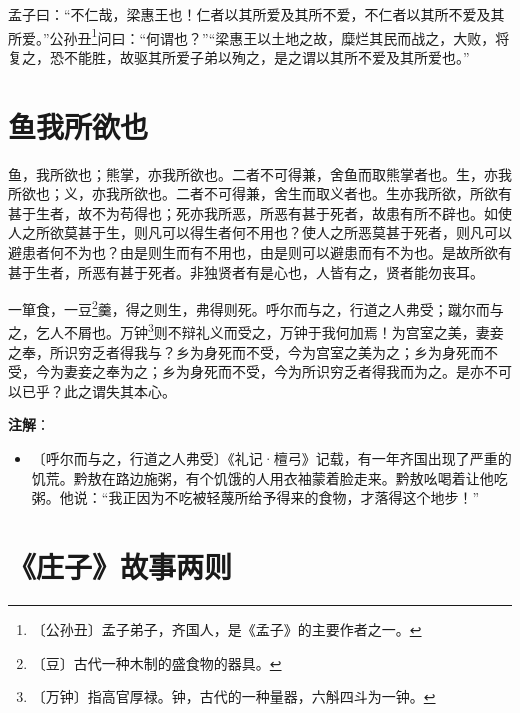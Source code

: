 \documentclass[12pt,UTF-8,openany]{ctexbook}
\begin{document}
\begin{normalsize}
    孟子曰：“不仁哉，梁惠王也！仁者以其所爱及其所不爱，不仁者以其所不爱及其所爱。”公孙丑\footnote{〔公孙丑〕孟子弟子，齐国人，是《孟子》的主要作者之一。}问曰：“何谓也？”“梁惠王以土地之故，糜烂其民而战之，大败，将复之，恐不能胜，故驱其所爱子弟以殉之，是之谓以其所不爱及其所爱也。”
\end{normalsize}



\chapter{鱼我所欲也}

\begin{normalsize}
    
    鱼，我所欲也；熊掌，亦我所欲也。二者不可得兼，舍鱼而取熊掌者也。生，亦我所欲也；义，亦我所欲也。二者不可得兼，舍生而取义者也。生亦我所欲，所欲有甚于生者，故不为苟得也；死亦我所恶，所恶有甚于死者，故患有所不辟也。如使人之所欲莫甚于生，则凡可以得生者何不用也？使人之所恶莫甚于死者，则凡可以避患者何不为也？由是则生而有不用也，由是则可以避患而有不为也。是故所欲有甚于生者，所恶有甚于死者。非独贤者有是心也，人皆有之，贤者能勿丧耳。
    
    一箪食，一豆\footnote{〔豆〕古代一种木制的盛食物的器具。}羹，得之则生，弗得则死。呼尔而与之，行道之人弗受；蹴尔而与之，乞人不屑也。万钟\footnote{〔万钟〕指高官厚禄。钟，古代的一种量器，六斛四斗为一钟。}则不辩礼义而受之，万钟于我何加焉！为宫室之美，妻妾之奉，所识穷乏者得我与？乡为身死而不受，今为宫室之美为之；乡为身死而不受，今为妻妾之奉为之；乡为身死而不受，今为所识穷乏者得我而为之。是亦不可以已乎？此之谓失其本心。
\end{normalsize}


\newpage

\textbf{注解}：

\vspace{-1em}

\begin{itemize}
    \setlength\itemsep{-0.2em}
    \item〔呼尔而与之，行道之人弗受〕《礼记·檀弓》记载，有一年齐国出现了严重的饥荒。黔敖在路边施粥，有个饥饿的人用衣袖蒙着脸走来。黔敖吆喝着让他吃粥。他说：“我正因为不吃被轻蔑所给予得来的食物，才落得这个地步！”
\end{itemize}

\chapter{《庄子》故事两则}
\end{document}
